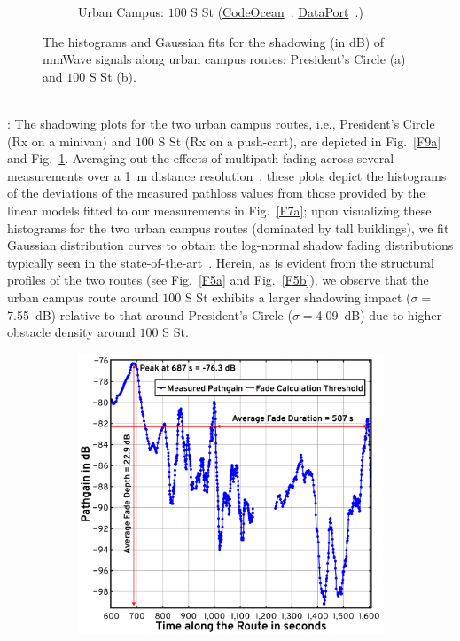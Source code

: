 \documentclass[10pt, twocolumn]{IEEEtran}
\begin{document}
{\begin{figure} [t]
\begin{subfigure}{0.4935\linewidth}
        \caption{Urban Campus: $100$ S St (\href{https://codeocean.com/capsule/9545863/tree}{CodeOcean}~\cite{CodeOcean}. \href{http://ieee-dataport.org/12580}{DataPort}~\cite{DataPort}.)}
        \label{F9b}
    \end{subfigure}
    \vspace{-5mm}
    \caption{The histograms and Gaussian fits for the shadowing (in dB) of mmWave signals along urban campus routes: President's Circle (a) and $100$ S St (b).}
    \vspace{-4mm}
    \label{F9}
\end{figure}
\\: The shadowing plots for the two urban campus routes, i.e., President's Circle (Rx on a minivan) and $100$ S St (Rx on a push-cart), are depicted in Fig.~\ref{F9a} and Fig.~\ref{F9b}. Averaging out the effects of multipath fading across several measurements over a \SI{1}{\meter} distance resolution~\cite{Averaging_Threshold}, these plots depict the histograms of the deviations of the measured pathloss values from those provided by the linear models fitted to our measurements in Fig.~\ref{F7a}; upon visualizing these histograms for the two urban campus routes (dominated by tall buildings), we fit Gaussian distribution curves to obtain the log-normal shadow fading distributions typically seen in the state-of-the-art~\cite{DopplerHST}. Herein, as is evident from the structural profiles of the two routes (see Fig.~\ref{F5a} and Fig.~\ref{F5b}), we observe that the urban campus route around $100$ S St exhibits a larger shadowing impact ($\sigma{=}$\SI{7.55}{\deci\bel}) relative to that around President's Circle ($\sigma{=}$\SI{4.09}{\deci\bel}) due to higher obstacle density around $100$ S St.
\begin{figure} [t]
    \centering
    \begin{subfigure}{0.5\linewidth}
        \centering
        \includegraphics[width=0.95\linewidth]{figs/urban_campus_pathgain_vs_time_gap_annotated.pdf}

\end{subfigure}
\end{figure}}
\end{document}
